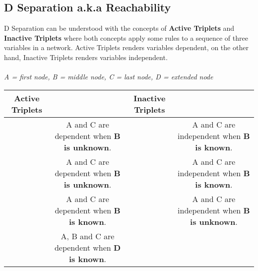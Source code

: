 \documentclass[12pt]{article}
\begin{document}
\subsection*{D Separation a.k.a Reachability}
D Separation can be understood with the concepts of \textbf{Active Triplets} and \textbf{Inactive Triplets} where both concepts apply some rules to a sequence of three variables in a network. Active Triplets renders variables dependent, on the other hand, Inactive Triplets renders variables independent.\\\\
\textit{A = first node, B = middle node, C = last node, D = extended node}
\begin{center}
\begin{tabular}{|c|c|c|c|}
\hline
Active Triplets 
&
&
Inactive Triplets
& \\ \hline
\raisebox{-\totalheight}{\texttt{[image: probs11]}} 
& 
\parbox[c]{0.25\textwidth}{A and C are dependent when \textbf{B is unknown}.}
&  
& \parbox[c]{0.25\textwidth}{A and C are independent when \textbf{B is known}.}\\[5em] \hline
& 
\parbox[c]{0.25\textwidth}{A and C are dependent when \textbf{B is unknown}.}
&  
& \parbox[c]{0.25\textwidth}{A and C are independent when \textbf{B is known}.}\\[5em] \hline
& 
\parbox[c]{0.25\textwidth}{A and C are dependent when \textbf{B is known}.}
&  
& \parbox[c]{0.25\textwidth}{A and C are independent when \textbf{B is unknown}.}\\[5em] \hline
& 
\parbox[c]{0.25\textwidth}{A, B and C are dependent when \textbf{D is known}.}
& &\\
\hline
\end{tabular}
\end{center}
\end{document}
